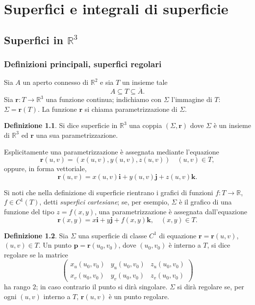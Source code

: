 \documentclass[a4paper]{book}
\numberwithin{equation}{section}
\theoremstyle{plain}
\theoremstyle{definition}
\newtheorem{defn}{Definizione}[section]
\theoremstyle{remark}
\renewcommand{\vec}{\boldsymbol}
\theoremstyle{example}
\begin{document}
\chapter{Superfici e integrali di superficie}

\section{Superfici in $\mathbb{R}^3$}

\subsection{Definizioni principali, superfici regolari}

Sia $A$ un aperto connesso di $\mathbb{R}^2$ e sia $T$ un insieme tale
\begin{equation*}
	A \subseteq T \subseteq \overline{A}.
\end{equation*}
Sia $\vec{r}\colon T \to \mathbb{R}^3$ una funzione continua; indichiamo con $\Sigma$ l'immagine di $T$: $\Sigma = \vec{r}(T)$. La funzione $\vec{r}$ si chiama parametrizzazione di $\Sigma$.
\begin{defn}
	Si dice superficie in $\mathbb{R}^3$ una coppia $(\Sigma, \vec{r})$ dove $\Sigma$ è un insieme di $\mathbb{R}^3$ ed $\vec{r}$ una sua parametrizzazione.
\end{defn}

Esplicitamente una parametrizzazione è assegnata mediante l'equazione
\begin{equation*}
	\vec{r}(u, v) = (x(u, v), y(u, v), z(u,v)) \quad (u, v) \in T,
\end{equation*}
oppure, in forma vettoriale,
\begin{equation*}
	\vec{r}(u, v) = x(u,v)\vec{i}+y(u,v)\vec{j} + z(u,v)\vec{k}.
\end{equation*}

Si noti che nella definizione di superficie rientrano i grafici di funzioni $f \colon T \to \mathbb{R}$, $f \in C^1(T)$, detti \emph{superfici cartesiane}; se, per esempio, $\Sigma$ è il grafico di una funzione del tipo $z = f(x, y)$, una parametrizzazione è assegnata dall'equazione
\begin{equation}
	\label{eqn:supcart}
	\vec{r}(x, y) = x\vec{i} + y\vec{j}+ f(x, y)\vec{k}, \quad (x, y) \in T.
\end{equation}

\begin{defn}
	Sia $\Sigma$ una superficie di classe $C^1$ di equazione $\vec{r} = \vec{r}(u,v)$, $(u, v) \in T$. Un punto $\vec{p} = \vec{r}(u_0, v_0)$, dove $(u_0, v_0)$ è interno a $T$, si dice regolare se la matrice
	\begin{equation}
		\label{eqn:matrsup}
		\begin{pmatrix}
			x_u(u_0, v_0) & y_u(u_0, v_0) & z_u(u_0, v_0) \\
			x_v(u_0, v_0) & y_v(u_0, v_0) & z_v(u_0, v_0)
		\end{pmatrix}
	\end{equation}
	ha rango $2$; in caso contrario il punto si dirà singolare. $\Sigma$ si dirà regolare se, per ogni $(u, v)$ interno a $T$, $\vec{r}(u, v)$ è un punto regolare.
\end{defn}
\end{document}
